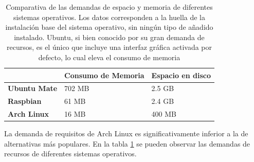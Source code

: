 

\begin{table}[H]
\centering
\begin{tabular}{|l|l|l|}
\hline
&\textbf{Consumo de Memoria} &\textbf{Espacio en disco}\\
\hline
\textbf{Ubuntu Mate}&702 MB&2.5 GB\\
\hline
\textbf{Raspbian}&61 MB&2.4 GB\\
\hline
\textbf{Arch Linux}&16 MB&400 MB\\
\hline
\end{tabular}
\caption[Comparativa de las demandas de espacio y memoria de diferentes sistemas operativos]{Comparativa de las demandas de espacio y memoria de diferentes sistemas operativos. Los datos corresponden a la huella de la instalación base del sistema operativo, sin ningún tipo de añadido instalado. Ubuntu, si bien conocido por su gran demanda de recursos, es el único que incluye una interfaz gráfica activada por defecto, lo cual eleva el consumo de memoria}
\label{os:footprint}
\end{table}

La demanda de requisitos de Arch Linux es significativamente inferior a la de alternativas más populares. En la tabla \ref{os:footprint} se pueden observar las demandas de recursos de diferentes sistemas operativos.



